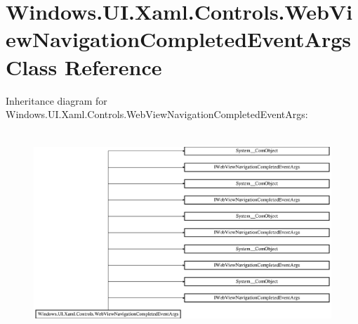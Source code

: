\hypertarget{class_windows_1_1_u_i_1_1_xaml_1_1_controls_1_1_web_view_navigation_completed_event_args}{}\section{Windows.\+U\+I.\+Xaml.\+Controls.\+Web\+View\+Navigation\+Completed\+Event\+Args Class Reference}
\label{class_windows_1_1_u_i_1_1_xaml_1_1_controls_1_1_web_view_navigation_completed_event_args}
Inheritance diagram for Windows.\+U\+I.\+Xaml.\+Controls.\+Web\+View\+Navigation\+Completed\+Event\+Args\+:\begin{figure}[H]
\begin{center}
\leavevmode
\includegraphics[height=7.642680cm]{class_windows_1_1_u_i_1_1_xaml_1_1_controls_1_1_web_view_navigation_completed_event_args}
\end{center}
\end{figure}
